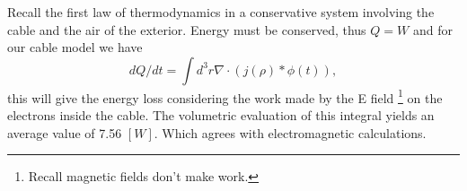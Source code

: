 Recall the first law of thermodynamics in a conservative system involving the cable and the air of the exterior. Energy must be conserved, thus $Q=W$ and for our cable model we have
\begin{equation}
    dQ/dt = \int d^3r \nabla \cdot (j(\rho)*\phi(t)) ,
\end{equation}
this will give the energy loss considering the work made by the E field \footnote{Recall magnetic fields don't make work.} on the electrons inside the cable. The volumetric evaluation of this integral yields an average value of 7.56 $[W]$. Which agrees with electromagnetic calculations. 


